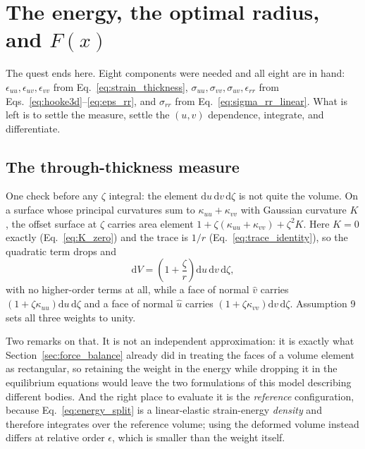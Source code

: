 \documentclass[11pt]{article}
\begin{document}
\section{The energy, the optimal radius, and \texorpdfstring{$F(x)$}{F(x)}}
\label{sec:energy}
The quest ends here. Eight components were needed and all eight are in hand:
$\epsilon_{uu},\epsilon_{uv},\epsilon_{vv}$ from
Eq.~\eqref{eq:strain_thickness}, $\sigma_{uu},\sigma_{vv},\sigma_{uv},
\epsilon_{rr}$ from Eqs.~\eqref{eq:hooke3d}--\eqref{eq:eps_rr}, and
$\sigma_{rr}$ from Eq.~\eqref{eq:sigma_rr_linear}. What is left is to settle the
measure, settle the $(u,v)$ dependence, integrate, and differentiate.

\subsection{The through-thickness measure}\label{sec:measure}
One check before any $\zeta$ integral: the element
$\mathrm du\,\mathrm dv\,\mathrm d\zeta$ is not quite the volume. On a surface
whose principal curvatures sum to $\kappa_{uu}+\kappa_{vv}$ with Gaussian
curvature $K$, the offset surface at $\zeta$ carries area element
$1+\zeta\left(\kappa_{uu}+\kappa_{vv}\right)+\zeta^{2}K$. Here $K=0$ exactly
(Eq.~\ref{eq:K_zero}) and the trace is $1/r$
(Eq.~\ref{eq:trace_identity}), so the quadratic term drops and
\begin{equation}\label{eq:volume_element}
    \boxed{\;\mathrm dV = \left(1+\frac{\zeta}{r}\right)
      \mathrm du\,\mathrm dv\,\mathrm d\zeta,\;}
\end{equation}
with no higher-order terms at all, while a face of normal $\hat v$ carries
$\left(1+\zeta\kappa_{uu}\right)\mathrm du\,\mathrm d\zeta$ and a face of normal
$\hat u$ carries $\left(1+\zeta\kappa_{vv}\right)\mathrm dv\,\mathrm d\zeta$.
Assumption 9 sets all three weights to unity.

Two remarks on that. It is not an independent approximation: it is exactly what
Section~\ref{sec:force_balance} already did in treating the faces of a volume
element as rectangular, so retaining the weight in the energy while dropping it
in the equilibrium equations would leave the two formulations of this model
describing different bodies. And the right place to evaluate it is the
\emph{reference} configuration, because Eq.~\eqref{eq:energy_split} is a
linear-elastic strain-energy \emph{density} and therefore integrates over the
reference volume; using the deformed volume instead differs at relative order
$\epsilon$, which is smaller than the weight itself.
\end{document}

